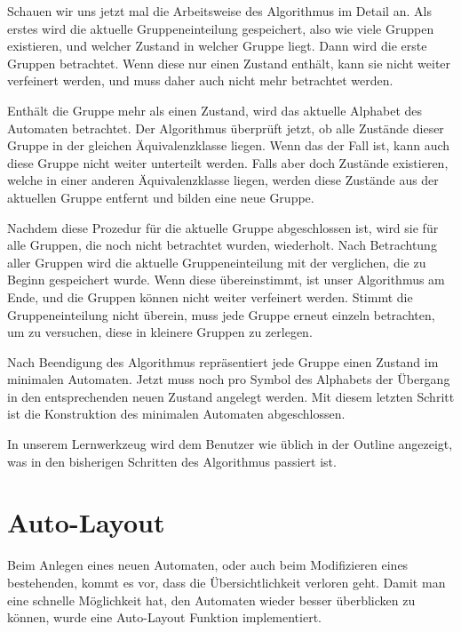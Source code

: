 Schauen wir uns jetzt mal die Arbeitsweise des Algorithmus im Detail an. Als
erstes wird die aktuelle Gruppeneinteilung gespeichert, also wie viele
Gruppen existieren, und welcher Zustand in welcher Gruppe liegt. Dann wird
die erste Gruppen betrachtet. Wenn diese nur einen Zustand enthält, kann sie
nicht weiter verfeinert werden, und muss daher auch nicht mehr betrachtet werden.
\vspace{10pt}

Enthält die Gruppe mehr als einen Zustand, wird das aktuelle Alphabet des
Automaten betrachtet. Der Algorithmus überprüft jetzt, ob alle Zustände dieser
Gruppe in der gleichen Äquivalenzklasse liegen. Wenn das der Fall ist, kann auch
diese Gruppe nicht weiter unterteilt werden. Falls aber doch Zustände
existieren, welche in einer anderen Äquivalenz\-klasse liegen, werden diese
Zustände aus der aktuellen Gruppe entfernt und bilden eine neue Gruppe. \vspace{10pt}

Nachdem diese Prozedur für die aktuelle Gruppe abgeschlossen ist, wird sie für
alle Gruppen, die noch nicht betrachtet wurden, wiederholt. Nach Betrachtung aller
Gruppen wird die aktuelle Gruppeneinteilung mit der verglichen, die zu Beginn
gespeichert wurde. Wenn diese übereinstimmt, ist unser Algorithmus am Ende, und
die Gruppen können nicht weiter verfeinert werden. Stimmt die Gruppeneinteilung
nicht überein, muss jede Gruppe erneut einzeln betrachten, um zu versuchen,
diese in kleinere Gruppen zu zerlegen.\vspace{10pt}

Nach Beendigung des Algorithmus repräsentiert jede Gruppe einen Zustand
im minimalen Automaten. Jetzt muss noch pro Symbol des Alphabets der
Übergang in den entsprechenden neuen Zustand angelegt werden. Mit diesem
letzten Schritt ist die Konstruktion des minimalen Automaten
abgeschlossen.\vspace{10pt}

In unserem Lernwerkzeug wird dem Benutzer wie üblich in der Outline angezeigt,
was in den bisherigen Schritten des Algorithmus passiert ist.\vspace{10pt}


\section{Auto-Layout}\label{AutoLayout}

Beim Anlegen eines neuen Automaten, oder auch beim Modifizieren eines
bestehenden, kommt es vor, dass die Übersichtlichkeit verloren geht. Damit man
eine schnelle Möglichkeit hat, den Automaten wieder besser überblicken zu
können, wurde eine Auto-Layout Funktion implementiert.\vspace{10pt}

